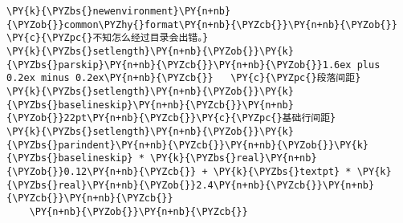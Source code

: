 \begin{Verbatim}[commandchars=\\\{\}]
\PY{k}{\PYZbs{}newenvironment}\PY{n+nb}{\PYZob{}}common\PYZhy{}format\PY{n+nb}{\PYZcb{}}\PY{n+nb}{\PYZob{}} \PY{c}{\PYZpc{}不知怎么经过目录会出错。}
\PY{k}{\PYZbs{}setlength}\PY{n+nb}{\PYZob{}}\PY{k}{\PYZbs{}parskip}\PY{n+nb}{\PYZcb{}}\PY{n+nb}{\PYZob{}}1.6ex plus 0.2ex minus 0.2ex\PY{n+nb}{\PYZcb{}}   \PY{c}{\PYZpc{}段落间距}
\PY{k}{\PYZbs{}setlength}\PY{n+nb}{\PYZob{}}\PY{k}{\PYZbs{}baselineskip}\PY{n+nb}{\PYZcb{}}\PY{n+nb}{\PYZob{}}22pt\PY{n+nb}{\PYZcb{}}\PY{c}{\PYZpc{}基础行间距}
\PY{k}{\PYZbs{}setlength}\PY{n+nb}{\PYZob{}}\PY{k}{\PYZbs{}parindent}\PY{n+nb}{\PYZcb{}}\PY{n+nb}{\PYZob{}}\PY{k}{\PYZbs{}baselineskip} * \PY{k}{\PYZbs{}real}\PY{n+nb}{\PYZob{}}0.12\PY{n+nb}{\PYZcb{}} + \PY{k}{\PYZbs{}textpt} * \PY{k}{\PYZbs{}real}\PY{n+nb}{\PYZob{}}2.4\PY{n+nb}{\PYZcb{}}\PY{n+nb}{\PYZcb{}}\PY{n+nb}{\PYZcb{}}
    \PY{n+nb}{\PYZob{}}\PY{n+nb}{\PYZcb{}}
\end{Verbatim}
